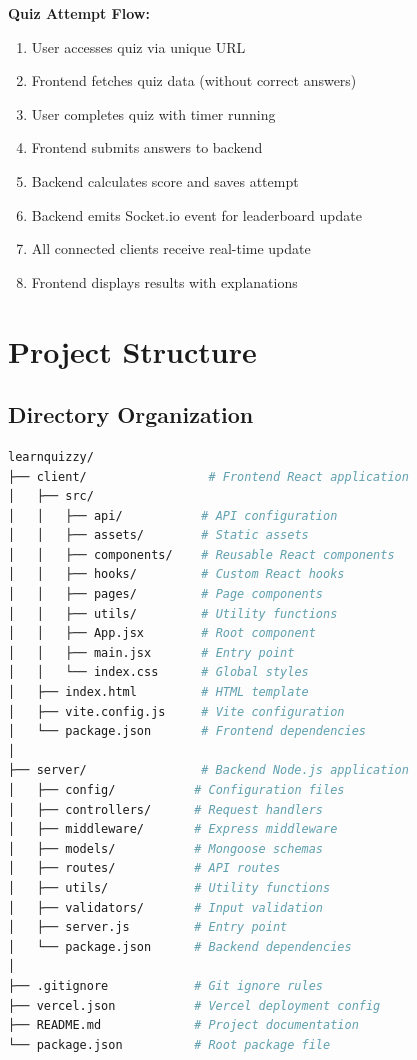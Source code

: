\documentclass[12pt,a4paper]{article}
\begin{document}
\textbf{Quiz Attempt Flow:}
\begin{enumerate}
    \item User accesses quiz via unique URL
    \item Frontend fetches quiz data (without correct answers)
    \item User completes quiz with timer running
    \item Frontend submits answers to backend
    \item Backend calculates score and saves attempt
    \item Backend emits Socket.io event for leaderboard update
    \item All connected clients receive real-time update
    \item Frontend displays results with explanations
\end{enumerate}

\newpage

\section{Project Structure}

\subsection{Directory Organization}

\begin{lstlisting}[language=bash]
learnquizzy/
├── client/                 # Frontend React application
│   ├── src/
│   │   ├── api/           # API configuration
│   │   ├── assets/        # Static assets
│   │   ├── components/    # Reusable React components
│   │   ├── hooks/         # Custom React hooks
│   │   ├── pages/         # Page components
│   │   ├── utils/         # Utility functions
│   │   ├── App.jsx        # Root component
│   │   ├── main.jsx       # Entry point
│   │   └── index.css      # Global styles
│   ├── index.html         # HTML template
│   ├── vite.config.js     # Vite configuration
│   └── package.json       # Frontend dependencies
│
├── server/                # Backend Node.js application
│   ├── config/           # Configuration files
│   ├── controllers/      # Request handlers
│   ├── middleware/       # Express middleware
│   ├── models/           # Mongoose schemas
│   ├── routes/           # API routes
│   ├── utils/            # Utility functions
│   ├── validators/       # Input validation
│   ├── server.js         # Entry point
│   └── package.json      # Backend dependencies
│
├── .gitignore            # Git ignore rules
├── vercel.json           # Vercel deployment config
├── README.md             # Project documentation
└── package.json          # Root package file
\end{lstlisting}
\end{document}
